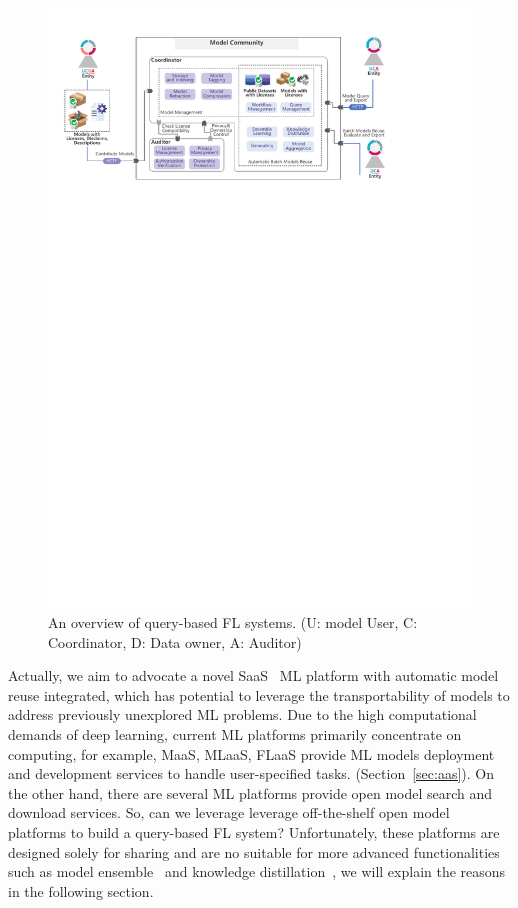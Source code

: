 \begin{figure}[t]
  \centering
  \includegraphics[width=\linewidth]{fig/query_frame.pdf}
  \caption{An overview of query-based FL systems. (U: model User, C: Coordinator, D: Data owner, A: Auditor)}
  \Description{}
  \label{fig:query}
\end{figure}

Actually, we aim to advocate a novel SaaS~\cite{brereton1999future} ML platform with automatic model reuse integrated, which has potential to leverage the transportability of models to address previously unexplored ML problems.
Due to the high computational demands of deep learning, current ML platforms primarily concentrate on computing, for example, MaaS, MLaaS, FLaaS provide ML models deployment and development services to handle user-specified tasks. (Section~\ref{sec:aas}).
On the other hand, there are several ML platforms provide open model search and download services. 
So, can we leverage leverage off-the-shelf open model platforms to build a query-based FL system?
Unfortunately, these platforms are designed solely for sharing and are no suitable for more advanced functionalities such as model ensemble~\cite{jacobs1991adaptive} and knowledge distillation~\cite{hinton2015distilling}, we will explain the reasons in the following section.

